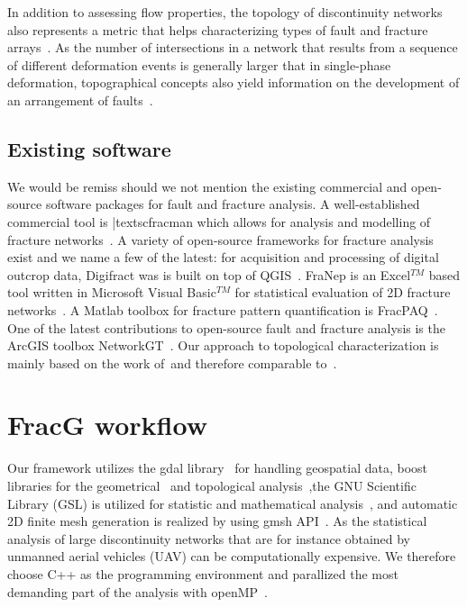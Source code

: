 \documentclass[a4paper,fleqn]{cas-sc}
\begin{document}
In addition to assessing flow properties, the topology of discontinuity networks also represents a metric that helps characterizing types of fault and fracture arrays~\citep{Morley2016}. As the number of intersections in a network that results from a sequence of different deformation events is generally larger that in single-phase deformation, topographical concepts also yield information on the development of an arrangement of faults~\citep{Duffy2017}.

\subsection{Existing software}
We would be remiss should we not mention the existing commercial and open-source software packages for fault and fracture analysis. A well-established commercial tool is |textsc{fracman}  which allows for analysis and modelling of fracture networks~\citep{Fracman2011}. A variety of open-source frameworks for fracture analysis exist and we name a few of the latest: for acquisition and processing of digital outcrop data, Digifract was is built on top of QGIS~\citep{Hardebol2013}.  FraNep is an Excel$^{TM}$ based tool written in Microsoft Visual Basic$^{TM}$ for statistical evaluation of 2D fracture networks~\citep{Zeeb2013}. A Matlab toolbox for fracture pattern quantification is FracPAQ~\citep{Healy2017}. One of the latest contributions to open-source fault and fracture analysis is the ArcGIS toolbox NetworkGT~\citep{Nyberg2018}. Our approach to topological characterization is mainly based on the work of~\citep{Sanderson2018, Sanderson2019}and therefore comparable to~\citep{Nyberg2018}.

\section{FracG workflow}
Our framework utilizes the gdal library~\citep{Gdal2018} for handling geospatial data, boost libraries for the geometrical~\citep{Gehrels2016} and topological analysis~\citep{Siek2001},the GNU Scientific Library (GSL) is utilized for statistic and mathematical analysis~\citep{Gough2009}, and automatic 2D finite mesh generation is realized by using gmsh API~\citep{Gehrels2016}. As the statistical analysis of large discontinuity networks that are for instance obtained by unmanned aerial vehicles (UAV) can be computationally expensive. We therefore choose C++ as the programming environment and parallized the most demanding part of the analysis with openMP~\citep{Dagum1998}. 
\end{document}
